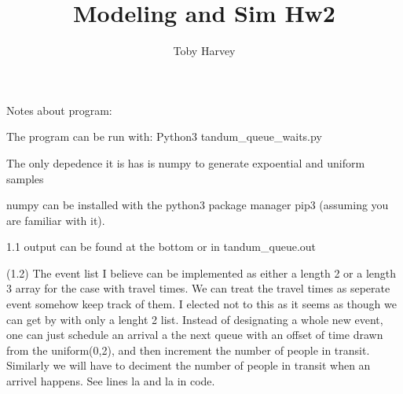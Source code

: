 \documentclass{article}
\begin{document}
\title{Modeling and Sim Hw2}
\author{Toby Harvey}
\maketitle

Notes about program:

The program can be run with: Python3 tandum\_queue\_waits.py

The only depedence it is has is numpy to generate expoential and uniform samples

numpy can be installed with the python3 package manager pip3 (assuming you are familiar with it).

\vspace{3mm}

1.1 output can be found at the bottom or in tandum\_queue.out

(1.2) The event list I believe can be implemented as either a length 2 or a length 3 array for the case with travel times. We can treat the travel times as seperate event somehow keep track of them. I elected not to this as it seems as though we can get by with only a lenght 2 list. Instead of designating a whole new event, one can just schedule an arrival a the next queue with an offset of time drawn from the uniform(0,2), and then increment the number of people in transit. Similarly we will have to deciment the number of people in transit when an arrivel happens. See lines la and la in code.
\end{document}
